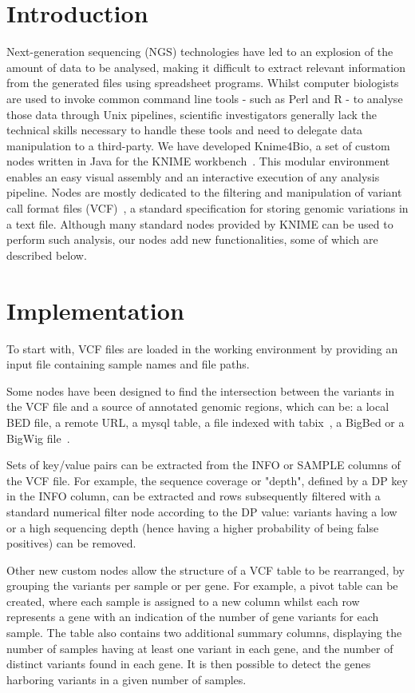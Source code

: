 \documentclass{bioinfo}
\begin{document}
\section{Introduction}

Next-generation sequencing (NGS) technologies have led to an explosion of the amount of data to be analysed, making it difficult to extract relevant information from the generated files using spreadsheet programs. Whilst computer biologists are used to invoke common command line tools - such as Perl and R - to analyse those data through Unix pipelines, scientific investigators generally lack the technical skills necessary to handle these tools and need to delegate data manipulation to a third-party. 
We have developed Knime4Bio, a set of custom nodes  written in Java for the KNIME workbench~\citep{knimeref}. This modular environment enables an easy visual assembly and an interactive execution of any analysis pipeline. Nodes are mostly dedicated to the filtering and manipulation of variant call format files (VCF)~\citep{pmid21653522}, a standard specification for storing genomic variations in a text file. Although many standard nodes provided by KNIME can be used to perform such analysis, our nodes add new functionalities, some of which are described below.

\section{Implementation}

To start with, VCF files are loaded in the working environment by providing an input file containing sample names and file paths.

Some nodes have been designed to find the intersection between the variants in the VCF file and a source of annotated genomic regions, which can be: a local BED file, a remote URL, a mysql table, a file indexed with tabix~\citep{pmid21208982}, a BigBed or a BigWig file~\citep{pmid20639541}.


Sets of key/value pairs can be extracted from the INFO or SAMPLE columns of the VCF file. For example, the sequence coverage or "depth", defined by a DP key in the INFO column, can be extracted and rows subsequently filtered with a standard numerical filter node according to the DP value: variants having a low or a high sequencing depth (hence having a higher probability of being false positives) can be removed.


Other new custom nodes allow the structure of a VCF table to be rearranged, by grouping the variants per sample or per gene. For example, a pivot table can be created, where each sample is assigned to a new column whilst each row represents a gene with an indication of the number of gene variants for each sample. The table also contains two additional summary columns, displaying the number of samples having at least one variant in each gene, and the number of distinct variants found in each gene. It is then possible to detect the genes harboring variants in a given number of samples.
\end{document}
